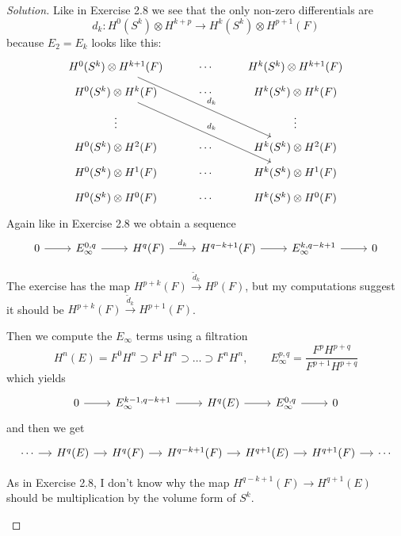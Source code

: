 \begin{proof}[Solution]\leavevmode
\iffalse The argument to construct the Wang exact sequence
\[\begin{tikzcd}[column sep=small]
	\cdots\arrow[r]&H_{q}(F)\arrow[r]&H_{q}(E)\arrow[r]&H_{q-n}(F)\arrow[r]&H_{q-1}(F)\arrow[r]&H_{q-1}(E)\arrow[r]&H_{q-n-1}(F)\arrow[r]&\cdots
\end{tikzcd}\]
is analogous to exercise 2.8.\fi
Like in Exercise 2.8 we see that the only non-zero differentials are
\[d_k:H^{0}(S^k)\otimes H^{k+p}\longrightarrow H^{k}(S^k)\otimes H^{p+1}(F)\]
because $E_{2}=E_k$ looks like this:
\[\begin{tikzcd}[row sep=tiny]
H^{0}(S^k)\otimes H^{k+1}(F)\arrow[rrddd,"d_k"]&\cdots & H^k(S^k)\otimes H^{k+1}(F)\\
	H^{0}(S^k)\otimes H^{k}(F)  \arrow[rrddd,"d_{k}"]&\cdots &H^{k}(S^k)\otimes H^{k}(F)\\
	\vdots &&\vdots \\
	H^{0}(S^k)\otimes H^{2}(F)&\cdots &H^{k}(S^k)\otimes H^{2}(F)\\
	H^{0}(S^k)\otimes H^{1}(F)&\cdots&H^k(S^k)\otimes H^{1}(F)\\
	H^{0}(S^k)\otimes H^{0}(F)&\cdots&H^{k}(S^k)\otimes H^{0}(F) 
\end{tikzcd}\]
Again like in Exercise 2.8 we obtain a sequence
\[\begin{tikzcd}
	0\arrow[r]&E_{\infty}^{0,q}\arrow[r]& H^{q}(F)\arrow[r,"d_k"]&H^{q-k+1}(F)\arrow[r]& E^{k,q-k+1}_{\infty}\arrow[r]&0
\end{tikzcd}\]
\begin{remark}
	The exercise has the map $H^{p+k}(F)\overset{\tilde{d}_{k}}{\longrightarrow} H^{p}(F)$, but my computations suggest it should be $H^{p+k}(F)\overset{\tilde{d}_k}{\longrightarrow}H^{p+1}(F)$.
\end{remark}
Then we compute the $E_{\infty}$ terms using a filtration
\[H^{n}(E)=F^0H^n\supset F^1H^n\supset  \ldots \supset F^nH^n,\qquad E_\infty^{p,q}=\frac{F^pH^{p+q}}{F^{p+1}H^{p+q}}\]
which yields
\[\begin{tikzcd}
	0\arrow[r]&E^{k-1,q-k+1}_{\infty}\arrow[r]&H^{q}(E)\arrow[r]&E^{0,q}_{\infty}\arrow[r]&0
\end{tikzcd}\]
and then we get
\[\begin{tikzcd}[column sep=small]
	\cdots\arrow[r]&H^{q}(E)\arrow[r]&H^{q}(F)\arrow[r]&H^{q-k+1}(F)\arrow[r]&H^{q+1}(E)\arrow[r]&H^{q+1}(F)\arrow[r]&\cdots
\end{tikzcd}\]
\begin{remark}
	As in Exercise 2.8, I don't know why the map $H^{q-k+1}(F)\to H^{q+1}(E)$ should be multiplication by the volume form of $S^k$.
\end{remark}


\end{proof}

